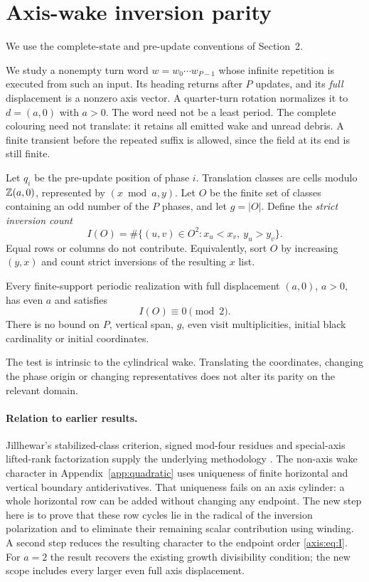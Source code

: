 \section{Axis-wake inversion parity}\label{axis:sec:axis}
We use the complete-state and pre-update conventions of Section~2.

We study a nonempty turn word $w=w_0\cdots w_{P-1}$ whose infinite repetition
is executed from such an input. Its heading returns after $P$ updates, and its
\emph{full} displacement is a nonzero axis vector. A quarter-turn rotation
normalizes it to $d=(a,0)$ with $a>0$. The word need not be a least period.
The complete colouring need not translate: it retains all emitted wake and
unread debris. A finite transient before the repeated suffix is allowed,
since the field at its end is still finite.

Let $q_i$ be the pre-update position of phase $i$. Translation classes are
cells modulo $\mathbb Z(a,0)$, represented by $(x\bmod a,y)$. Let $O$ be the finite
set of classes containing an odd number of the $P$ phases, and let $g=|O|$.
Define the \emph{strict inversion count}
\begin{equation}\label{axis:eq:I}
 I(O)=\#\{(u,v)\in O^2:x_u<x_v,\ y_u>y_v\}.
\end{equation}
Equal rows or columns do not contribute. Equivalently, sort $O$ by increasing
$(y,x)$ and count strict inversions of the resulting $x$ list.

\begin{theorem}\label{axis:thm:main}
Every finite-support periodic realization with full displacement $(a,0)$,
$a>0$, has even $a$ and satisfies
\[
 \boxed{I(O)\equiv0\pmod2.}
\]
There is no bound on $P$, vertical span, $g$, even visit multiplicities,
initial black cardinality or initial coordinates.
\end{theorem}

The test is intrinsic to the cylindrical wake. Translating the coordinates,
changing the phase origin or changing representatives does not alter its
parity on the relevant domain.

\paragraph{Relation to earlier results.}
Jillhewar's stabilized-class criterion, signed mod-four residues and
special-axis lifted-rank factorization supply the underlying methodology
\cite{Jillhewar2026}. The non-axis wake character in Appendix~\ref{app:quadratic}
uses uniqueness of finite horizontal and vertical boundary antiderivatives.
That uniqueness fails on an axis cylinder: a whole horizontal row can be
added without changing any endpoint. The new step here is to prove that
these row cycles lie in the radical of the inversion polarization and to
eliminate their remaining scalar contribution using winding. A second step
reduces the resulting character to the endpoint order \eqref{axis:eq:I}.
For $a=2$ the result recovers the existing growth divisibility condition;
the new scope includes every larger even full axis displacement.

